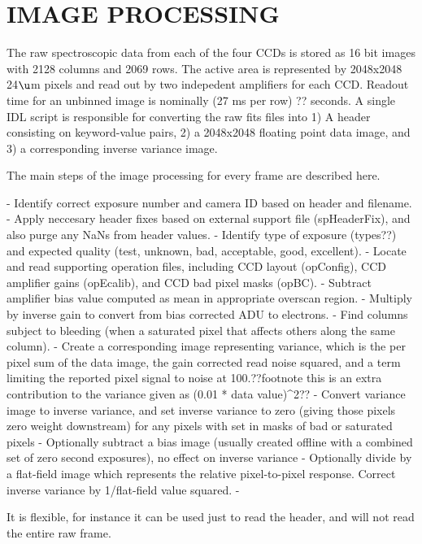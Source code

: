 \documentclass[12pt,preprint]{aastex}
\begin{document}
\section{IMAGE PROCESSING}
\label{sec_process}

The raw spectroscopic data from each of the four CCDs is stored as 16 bit images
with 2128 columns and 2069 rows.  The active area is represented by 2048x2048 
24$\u$m pixels and read out by two indepedent amplifiers for each CCD.  
Readout time for an unbinned image is nominally (27 ms per row) ?? seconds.
A single IDL script is responsible for converting the raw fits files into 
1) A header consisting on keyword-value pairs, 
2) a 2048x2048 floating point data image, and 
3) a corresponding inverse variance image. 

The main steps of the image processing for every frame are described here.

- Identify correct exposure number and camera ID based on header and filename.
- Apply neccesary header fixes based on external support file (spHeaderFix), and also purge any NaNs from header values.
- Identify type of exposure (types??) and expected quality (test, unknown, bad, acceptable, good, excellent). 
- Locate and read supporting operation files, including CCD layout (opConfig), CCD amplifier gains (opEcalib), and CCD bad pixel masks (opBC).
- Subtract amplifier bias value computed as mean in appropriate overscan region.
- Multiply by inverse gain to convert from bias corrected ADU to electrons.
- Find columns subject to bleeding (when a saturated pixel that affects others along the same column).
- Create a corresponding image representing variance, which is the per pixel sum of the data image, the gain corrected read noise squared, and a term limiting the reported pixel signal to noise at 100.??footnote this is an extra contribution to the variance given as (0.01 * data value)^2??
- Convert variance image to inverse variance, and set inverse variance to zero (giving those pixels zero weight downstream) for any pixels with set in masks of bad or saturated pixels
- Optionally subtract a bias image (usually created offline with a combined set of zero second exposures), no effect on inverse variance
- Optionally divide by a flat-field image which represents the relative pixel-to-pixel response.  Correct inverse variance by 1/flat-field value squared.  
- 

It is flexible, for instance it can be used just to read the header, and will not read the entire raw frame.
\end{document}
